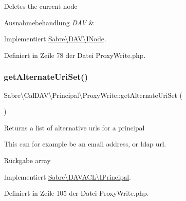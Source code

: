 Deletes the current node


\begin{DoxyExceptions}{Ausnahmebehandlung}
{\em D\+AV} & \\
\hline
\end{DoxyExceptions}


Implementiert \mbox{\hyperlink{interface_sabre_1_1_d_a_v_1_1_i_node_a72cd0ee4e36dfced2b0412d14dbd73e6}{Sabre\textbackslash{}\+D\+A\+V\textbackslash{}\+I\+Node}}.



Definiert in Zeile 78 der Datei Proxy\+Write.\+php.

\mbox{\label{class_sabre_1_1_cal_d_a_v_1_1_principal_1_1_proxy_write_ab33f269f2f62eb69c6f6b45f50d2e6f3}} 
\subsubsection{\texorpdfstring{get\+Alternate\+Uri\+Set()}{getAlternateUriSet()}}
{\footnotesize\ttfamily Sabre\textbackslash{}\+Cal\+D\+A\+V\textbackslash{}\+Principal\textbackslash{}\+Proxy\+Write\+::get\+Alternate\+Uri\+Set (\begin{DoxyParamCaption}{ }\end{DoxyParamCaption})}

Returns a list of alternative urls for a principal

This can for example be an email address, or ldap url.

\begin{DoxyReturn}{Rückgabe}
array 
\end{DoxyReturn}


Implementiert \mbox{\hyperlink{interface_sabre_1_1_d_a_v_a_c_l_1_1_i_principal_ac28ebb97541a792d73dd4e15d3b8cdb6}{Sabre\textbackslash{}\+D\+A\+V\+A\+C\+L\textbackslash{}\+I\+Principal}}.



Definiert in Zeile 105 der Datei Proxy\+Write.\+php.

\mbox{\label{class_sabre_1_1_cal_d_a_v_1_1_principal_1_1_proxy_write_ad5391ef6b5b3c78020e7f0db2862647d}} 
